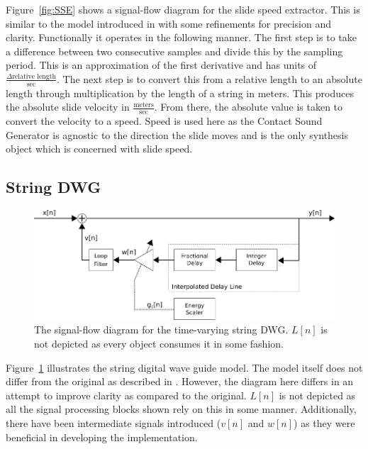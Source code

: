 \documentclass[../main.tex]{subfiles}
\begin{document}
Figure~\ref{fig:SSE} shows a signal-flow diagram for the slide speed extractor. This is similar to the model introduced in  with some refinements for precision and clarity. Functionally it operates in the following manner. The first step is to take a difference between two consecutive samples and divide this by the sampling period. This is an approximation of the first derivative and has units of $\frac{\Delta \text{relative length}}{\text{sec}}$. The next step is to convert this from a relative length to an absolute length through multiplication by the length of a string in meters. This produces the absolute slide velocity in $\frac{\text{meters}}{\text{sec}}$. From there, the absolute value is taken to convert the velocity to a speed. Speed is used here as the Contact Sound Generator is agnostic to the direction the slide moves and is the only synthesis object which is concerned with slide speed.

\subsection{String DWG}

\begin{figure}[h]
    \centering
    \includegraphics[scale=.5]{./images/diagrams/stringDWG.png}
    \caption{The signal-flow diagram for the time-varying string DWG. $L[n]$ is not depicted as every object consumes it in some fashion.}
    \label{fig:stringDWG}
\end{figure}

Figure~\ref{fig:stringDWG} illustrates the string digital wave guide model. The model itself does not differ from the original as described in . However, the diagram here differs in an attempt to improve clarity as compared to the original. $L[n]$ is not depicted as all the signal processing blocks shown rely on this in some manner. Additionally, there have been intermediate signals introduced ($v[n]$ and $w[n]$) as they were beneficial in developing the implementation.
\end{document}
